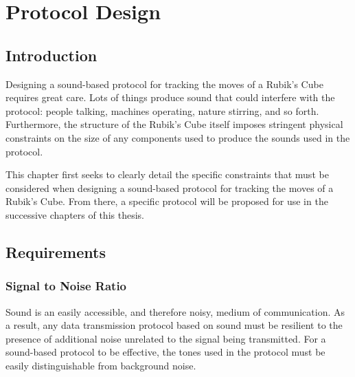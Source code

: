 
\chapter{Protocol Design} %

\label{Chapter4} %

\section{Introduction}
Designing a sound-based protocol for tracking the moves of a Rubik's Cube requires great care.
Lots of things produce sound that could interfere with the protocol: people talking, machines operating, nature stirring, and so forth.
Furthermore, the structure of the Rubik's Cube itself imposes stringent physical constraints on the size of any components used to produce the sounds used in the protocol.

This chapter first seeks to clearly detail the specific constraints that must be considered when designing a sound-based protocol for tracking the moves of a Rubik's Cube.
From there, a specific protocol will be proposed for use in the successive chapters of this thesis.


\section{Requirements}


\subsection{Signal to Noise Ratio}
Sound is an easily accessible, and therefore noisy, medium of communication.
As a result, any data transmission protocol based on sound must be resilient to the presence of additional noise unrelated to the signal being transmitted.
For a sound-based protocol to be effective, the tones used in the protocol must be easily distinguishable from background noise.

